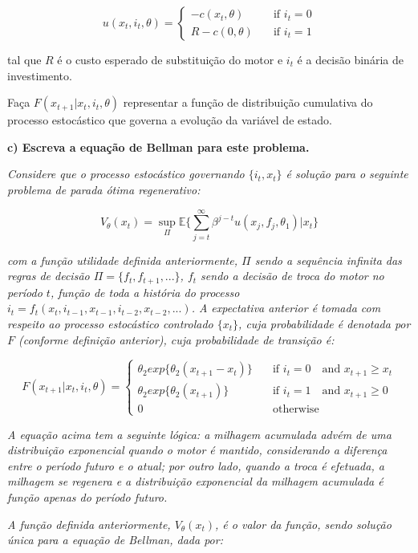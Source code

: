 \documentclass[12pt,a4paper]{article}
\begin{document}
\[ u(x_t,i_t,\theta) = 
  \begin{cases}
    -c(x_t,\theta)    & \quad \text{if } i_t=0\\
    R - c(0,\theta)  & \quad \text{if } i_t=1
  \end{cases}
\]

tal que \(R\) é o custo esperado de substituição do motor e \(i_t\) é a
decisão binária de investimento.

Faça \(F(x_{t+1}| x_t, i_t, \theta)\) representar a função de
distribuição cumulativa do processo estocástico que governa a evolução
da variável de estado.

\textbf{c) Escreva a equação de Bellman para este problema.}

\emph{Considere que o processo estocástico governando \(\{i_t,x_t\}\) é
solução para o seguinte problema de parada ótima regenerativo:}

\[
V_\theta(x_t)=\sup_\Pi \mathbb{E}\Bigg\{\sum_{j=t}^\infty \beta^{j-t}u(x_j,f_j,\theta_1)|x_t\Bigg\} 
\]

\emph{com a função utilidade definida anteriormente, \(\Pi\) sendo a
sequência infinita das regras de decisão \(\Pi=\{f_t,f_{t+1},...\}\),
\(f_t\) sendo a decisão de troca do motor no período \(t\), função de
toda a história do processo
\(i_t=f_t(x_t,i_{t-1},x_{t-1},i_{t-2},x_{t-2},...)\). A expectativa
anterior é tomada com respeito ao processo estocástico controlado
\(\{x_t\}\), cuja probabilidade é denotada por \(F\) (conforme definição
anterior), cuja probabilidade de transição é:}

\[
F(x_{t+1}| x_t, i_t, \theta) = 
  \begin{cases}
    \theta_2exp\{\theta_2(x_{t+1}-x_t)\}    & \quad \text{if } i_t=0  \quad \text{and } x_{t+1} \geq x_t \\
    \theta_2exp\{\theta_2(x_{t+1})\}    & \quad \text{if } i_t=1  \quad \text{and } x_{t+1} \geq 0 \\
     0 &  \quad \text{otherwise}
  \end{cases}
\]

\emph{A equação acima tem a seguinte lógica: a milhagem acumulada advém
de uma distribuição exponencial quando o motor é mantido, considerando a
diferença entre o período futuro e o atual; por outro lado, quando a
troca é efetuada, a milhagem se regenera e a distribuição exponencial da
milhagem acumulada é função apenas do período futuro.}

\emph{A função definida anteriormente, \(V_\theta(x_t)\), é o valor da
função, sendo solução única para a equação de Bellman, dada por:}
\end{document}
